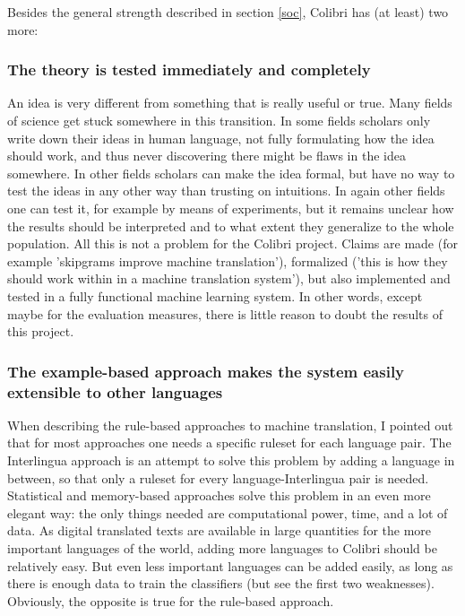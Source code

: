 \documentclass[12pt]{article}
\begin{document}
Besides the general strength described in section \ref{soc}, Colibri has (at least) two more:

\subsubsection{The theory is tested immediately and completely}

An idea is very different from something that is really useful or true. Many fields of science get stuck somewhere in this transition. In some fields scholars only write down their ideas in human language, not fully formulating how the idea should work, and thus never discovering there might be flaws in the idea somewhere. In other fields scholars can make the idea formal, but have no way to test the ideas in any other way than trusting on intuitions. In again other fields one can test it, for example by means of experiments, but it remains unclear how the results should be interpreted and to what extent they generalize to the whole population. All this is not a problem for the Colibri project. Claims are made (for example 'skipgrams improve machine translation'), formalized ('this is how they should work within in a machine translation system'), but also implemented and tested in a fully functional machine learning system. In other words, except maybe for the evaluation measures, there is little reason to doubt the results of this project. 

\subsubsection{The example-based approach makes the system easily extensible to other languages}

When describing the rule-based approaches to machine translation, I pointed out that for most approaches one needs a specific ruleset for each language pair. The Interlingua approach is an attempt to solve this problem by adding a language in between, so that only a ruleset for every language-Interlingua pair is needed. Statistical and memory-based approaches solve this problem in an even more elegant way: the only things needed are computational power, time, and a lot of data. As digital translated texts are available in large quantities for the more important languages of the world, adding more languages to Colibri should be relatively easy. But even less important languages can be added easily, as long as there is enough data to train the classifiers (but see the first two weaknesses). Obviously, the opposite is true for the rule-based approach.
\end{document}
